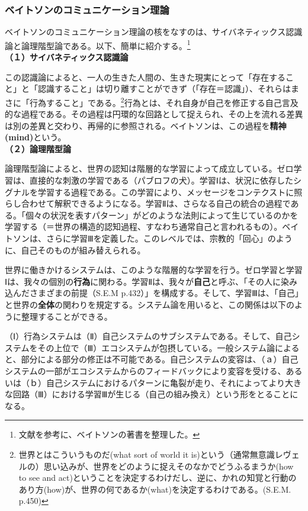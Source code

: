 \documentclass[9pt,b5j,twoside,twocolumn]{utarticle}
\begin{document}
\subsubsection*{ベイトソンのコミュニケーション理論}
ベイトソンのコミュニケーション理論の核をなすのは、サイバネティックス認識論と論理階型論である。以下、簡単に紹介する。\footnote{文献\cite{JIKO}を参考に、ベイトソンの著書\cite{SEM}を整理した。} \\
\textbf{（１）サイバネティックス認識論}


この認識論によると、一人の生きた人間の、生きた現実にとって「存在すること」と「認識すること」は切り離すことができず（「存在＝認識」）、それらはまさに「行為すること」である。\footnote{世界とはこういうものだ(what sort of world it is)という（通常無意識レヴェルの）思い込みが、世界をどのように捉えそのなかでどうふるまうか(how to see and act)ということを決定するわけだし、逆に、かれの知覚と行動のあり方(how)が、世界の何であるか(what)を決定するわけである。(S.E.M. p.450)}行為とは、それ自身が自己を修正する自己言及的な過程である。その過程は円環的な回路として捉えられ、その上を流れる差異は別の差異と交わり、再帰的に参照される。ベイトソンは、この過程を\textbf{精神(mind)}という。\\
\textbf{（２）論理階型論}


論理階型論によると、世界の認知は階層的な学習によって成立している。ゼロ学習は、直接的な刺激の学習である（パブロフの犬）。学習Ⅰは、状況に依存したシグナルを学習する過程である。この学習により、メッセージをコンテクストに照らし合わせて解釈できるようになる。学習Ⅱは、さらなる自己の統合の過程である。「個々の状況を表すパターン」がどのような法則によって生じているのかを学習する（＝世界の構造的認知過程、すなわち通常自己と言われるもの）。ベイトソンは、さらに学習Ⅲを定義した。このレベルでは、宗教的「回心」のように、自己そのものが組み替えられる。


世界に働きかけるシステムは、このような階層的な学習を行う。ゼロ学習と学習Ⅰは、我々の個別の\textbf{行為}に関わる。学習Ⅱは、我々が\textbf{自己}と呼ぶ、「その人に染み込んださまざまの前提（S.E.M p.432）」を構成する。そして、学習Ⅲは、「自己」と世界の\textbf{全体}の関わりを規定する。システム論を用いると、この関係は以下のように整理することができる\cite{JIKO}。

（Ⅰ）行為システムは（Ⅱ）自己システムのサブシステムである。そして、自己システムをその上位で（Ⅲ）エコシステムが包摂している。一般システム論によると、部分による部分の修正は不可能である。自己システムの変容は、（ａ）自己システムの一部がエコシステムからのフィードバックにより変容を受ける、あるいは（ｂ）自己システムにおけるパターンに亀裂が走り、それによってより大きな回路（Ⅲ）における学習Ⅲが生じる（自己の組み換え）という形をとることになる。
\end{document}
